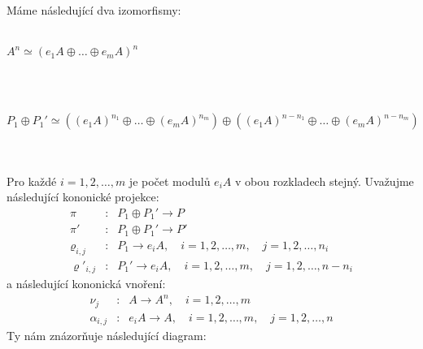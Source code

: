       \paragraph{ } Máme následující dva izomorfismy:  \\\\
      \centerline{$A^n \simeq (e_1A\oplus\ldots\oplus e_mA)^n$} \\\\
      \centerline{$P_1\oplus P_1' 
            \simeq 
            ((e_1A)^{n_1}\oplus \ldots \oplus(e_mA)^{n_m})
            \oplus
            ((e_1A)^{n-n_1}\oplus \ldots \oplus(e_mA)^{n-n_m})
          $} \\\\
      Pro každé $i=1,2,\ldots,m$ je počet modulů $e_iA$ v obou rozkladech stejný. Uvažujme následující 
      kononické projekce:      
      \begin{eqnarray}        
      \pi&:&P_1\oplus P_1' \rightarrow P \nonumber \\      
      \pi'&:&P_1\oplus P_1' \rightarrow P' \nonumber \\      
      \varrho_{i,j}&:&P_1 \rightarrow e_iA,  \quad i=1,2,\ldots,m, \quad j=1,2,\ldots,n_i \nonumber \\      
      \varrho'_{i,j}&:&P_1' \rightarrow e_iA, \quad i=1,2,\ldots,m, \quad j=1,2,\ldots,n-n_i \nonumber 
      \end{eqnarray}      
      a následující kononická vnoření:      
      \begin{eqnarray}             
        \nu_j&:&A \rightarrow A^n, \quad i=1,2,\ldots,m  \nonumber \\
        \alpha_{i,j}&:&e_iA \rightarrow A,    \quad i=1,2,\ldots,m, \quad j=1,2,\ldots,n   \nonumber 
      \end{eqnarray}  
      Ty nám znázorňuje následující diagram: \\\\
         \centerline{ } \\\\\\
